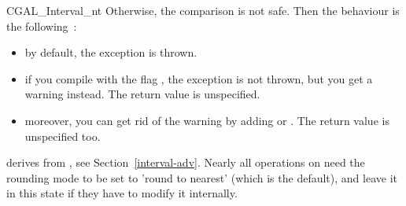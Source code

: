 \begin{ccClass} {CGAL_Interval_nt}
Otherwise, the comparison is not safe.  Then the behaviour is the following~:
\begin{itemize}
\item by default, the exception
     is thrown.
\item if you compile with the flag , the exception
    is not thrown, but you get a warning instead.
    The return value is unspecified.
\item moreover, you can get rid of the warning by adding
     or .
    The return value is unspecified too.
\end{itemize}

\ccImplementation

 derives from , 
see Section~\ref{interval-adv}.  Nearly all operations on
 need the rounding mode to be set to 'round to nearest'
(which is the default),
and leave it in this state if they have to modify it internally.

% 
% 
% 
% 
% 
% 

\end{ccClass}

